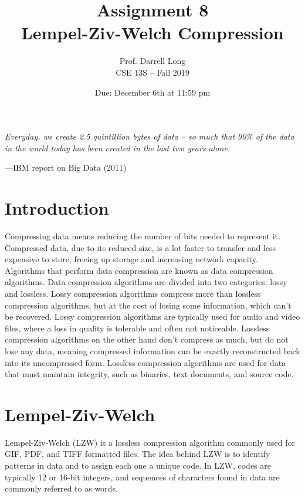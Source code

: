 \documentclass{article}
\title{Assignment 8 \\ Lempel-Ziv-Welch Compression}
\author{Prof. Darrell Long \\
CSE 13S -- Fall 2019}
\date{Due: December 6th at 11:59 pm}
\begin{document}
\maketitle

\lstset{language=C, style=c99}

\textwidth
\epigraph{\emph{Everyday, we create 2.5 quintillion bytes of data -- so much
that 90\% of the data in the world today has been created in the last two years
alone.}}{---IBM report on Big Data (2011)}

\section{Introduction}
Compressing data means reducing the number of bits needed to represent it.
Compressed data, due to its reduced size, is a lot faster to transfer and less expensive
to store, freeing up storage and increasing network capacity. Algorithms
that perform data compression are known as data compression algorithms. Data
compression algorithms are divided into two categories: lossy and lossless.
Lossy compression algorithms compress more than lossless compression algorithms,
but at the cost of losing some information, which can't be recovered. Lossy
compression algorithms are typically used for audio and video files, where a
loss in quality is tolerable and often not noticeable. Lossless compression
algorithms on the other hand don't compress as much, but do not lose any
data, meaning compressed information can be exactly reconstructed back into its
uncompressed form. Lossless compression algorithms are used for data that must
maintain integrity, such as binaries, text documents, and source code.

\section{Lempel-Ziv-Welch}
Lempel-Ziv-Welch (LZW) is a lossless compression algorithm commonly used for
GIF, PDF, and TIFF formatted files. The idea behind LZW is to identify patterns
in data and to assign each one a unique code. In LZW, codes are typically 12 or
16-bit integers, and sequences of characters found in data are commonly
referred to as words.
\end{document}
